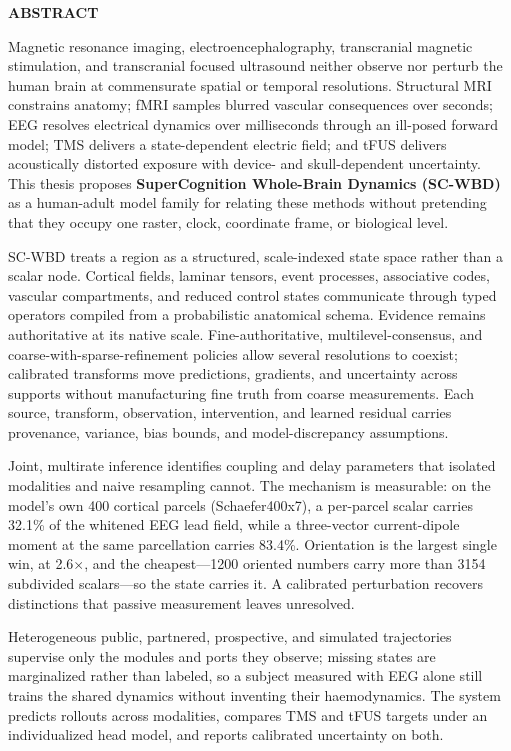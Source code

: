 \documentclass[10pt,a4paper]{article}
\begin{document}
\vspace{7mm}
{\sffamily\bfseries\fontsize{9}{10}\selectfont\color{frontpurple}ABSTRACT\par}
\vspace{2mm}
{\fontsize{9.1}{11.25}\selectfont\color{ink}
Magnetic resonance imaging, electroencephalography, transcranial magnetic stimulation, and transcranial focused ultrasound neither observe nor perturb the human brain at commensurate spatial or temporal resolutions. Structural MRI constrains anatomy; fMRI samples blurred vascular consequences over seconds; EEG resolves electrical dynamics over milliseconds through an ill-posed forward model; TMS delivers a state-dependent electric field; and tFUS delivers acoustically distorted exposure with device- and skull-dependent uncertainty. This thesis proposes \textbf{SuperCognition Whole-Brain Dynamics (SC-WBD)} as a human-adult model family for relating these methods without pretending that they occupy one raster, clock, coordinate frame, or biological level.

SC-WBD treats a region as a structured, scale-indexed state space rather than a scalar node. Cortical fields, laminar tensors, event processes, associative codes, vascular compartments, and reduced control states communicate through typed operators compiled from a probabilistic anatomical schema. Evidence remains authoritative at its native scale. Fine-authoritative, multilevel-consensus, and coarse-with-sparse-refinement policies allow several resolutions to coexist; calibrated transforms move predictions, gradients, and uncertainty across supports without manufacturing fine truth from coarse measurements. Each source, transform, observation, intervention, and learned residual carries provenance, variance, bias bounds, and model-discrepancy assumptions.

Joint, multirate inference identifies coupling and delay parameters that isolated modalities and naive resampling cannot. The mechanism is measurable: on the model's own 400 cortical parcels (Schaefer400x7), a per-parcel scalar carries 32.1\% of the whitened EEG lead field, while a three-vector current-dipole moment at the same parcellation carries 83.4\%. Orientation is the largest single win, at 2.6$\times$, and the cheapest---1200 oriented numbers carry more than 3154 subdivided scalars---so the state carries it. A calibrated perturbation recovers distinctions that passive measurement leaves unresolved.

Heterogeneous public, partnered, prospective, and simulated trajectories supervise only the modules and ports they observe; missing states are marginalized rather than labeled, so a subject measured with EEG alone still trains the shared dynamics without inventing their haemodynamics. The system predicts rollouts across modalities, compares TMS and tFUS targets under an individualized head model, and reports calibrated uncertainty on both.

}
\end{document}
